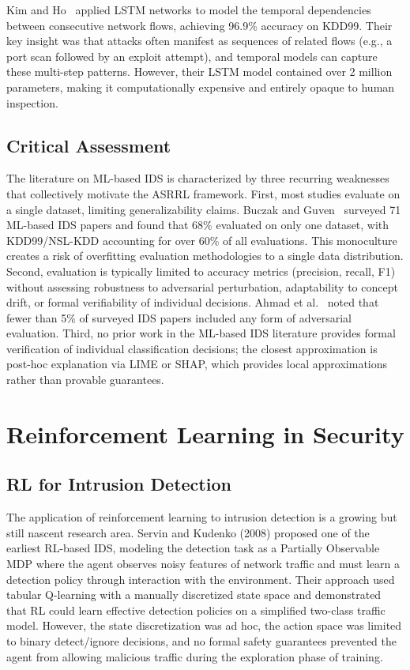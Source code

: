 \documentclass[12pt, letterpaper, oneside]{report}
\newcommand{\ASRRL}{\textsc{ASRRL}}
\begin{document}
Kim and Ho~\citep{kim2016} applied LSTM networks to model the temporal dependencies between consecutive network flows, achieving 96.9\% accuracy on KDD99. Their key insight was that attacks often manifest as sequences of related flows (e.g., a port scan followed by an exploit attempt), and temporal models can capture these multi-step patterns. However, their LSTM model contained over 2 million parameters, making it computationally expensive and entirely opaque to human inspection.

\subsection{Critical Assessment}

The literature on ML-based IDS is characterized by three recurring weaknesses that collectively motivate the \ASRRL{} framework. First, most studies evaluate on a single dataset, limiting generalizability claims. Buczak and Guven~\citep{buczak2016} surveyed 71 ML-based IDS papers and found that 68\% evaluated on only one dataset, with KDD99/NSL-KDD accounting for over 60\% of all evaluations. This monoculture creates a risk of overfitting evaluation methodologies to a single data distribution. Second, evaluation is typically limited to accuracy metrics (precision, recall, F1) without assessing robustness to adversarial perturbation, adaptability to concept drift, or formal verifiability of individual decisions. Ahmad et al.~\citep{ahmad2021} noted that fewer than 5\% of surveyed IDS papers included any form of adversarial evaluation. Third, no prior work in the ML-based IDS literature provides formal verification of individual classification decisions; the closest approximation is post-hoc explanation via LIME or SHAP, which provides local approximations rather than provable guarantees.


\section{Reinforcement Learning in Security}
\label{sec:lit_rl}

\subsection{RL for Intrusion Detection}

The application of reinforcement learning to intrusion detection is a growing but still nascent research area. Servin and Kudenko (2008) proposed one of the earliest RL-based IDS, modeling the detection task as a Partially Observable MDP where the agent observes noisy features of network traffic and must learn a detection policy through interaction with the environment. Their approach used tabular Q-learning with a manually discretized state space and demonstrated that RL could learn effective detection policies on a simplified two-class traffic model. However, the state discretization was ad hoc, the action space was limited to binary detect/ignore decisions, and no formal safety guarantees prevented the agent from allowing malicious traffic during the exploration phase of training.
\end{document}
